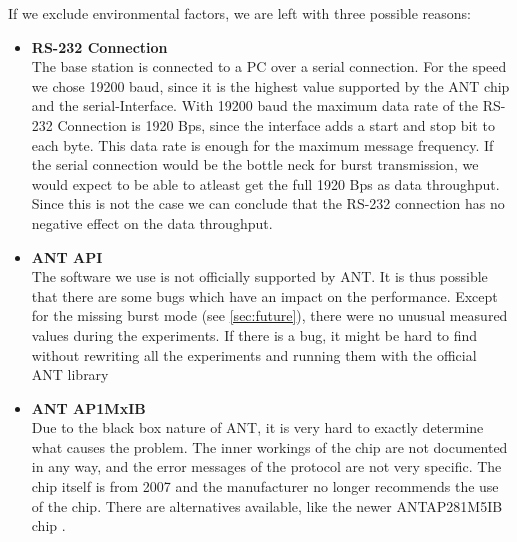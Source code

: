 If we exclude environmental factors, we are left with three possible reasons:
\begin{itemize}
	\item{\textbf{RS-232 Connection}} \hfill \\ The base station is connected to a PC over a serial connection. For the speed we chose 19200 baud, since it is the highest value supported by the ANT chip and the serial-Interface. With 19200 baud the maximum data rate of the RS-232 Connection is 1920 Bps, since the interface adds a start and stop bit to each byte. This data rate is enough for the maximum message frequency. If the serial connection would be the bottle neck for burst transmission, we would expect to be able to atleast get the full 1920 Bps as data throughput. Since this is not the case we can conclude that the RS-232 connection has no negative effect on the data throughput.

	\item{\textbf{ANT API}} \hfill \\ The software we use is not officially supported by ANT. It is thus possible that there are some bugs which have an impact on the performance. Except for the missing burst mode (see \ref{sec:future}), there were no unusual measured values during the experiments. If there is a bug, it might be hard to find without rewriting all the experiments and running them with the official ANT library \cite{ANTWinLib}
	
	\item{\textbf{ANT AP1MxIB}} \hfill \\ Due to the black box nature of ANT, it is very hard to exactly determine what causes the problem. The inner workings of the chip are not documented in any way, and the error messages of the protocol are not very specific. The chip itself is from 2007 and the manufacturer no longer recommends the use of the chip\cite{AP1page}. There are alternatives available, like the newer ANTAP281M5IB chip \cite{AP2Datasheet}.
\end{itemize}
\newpage